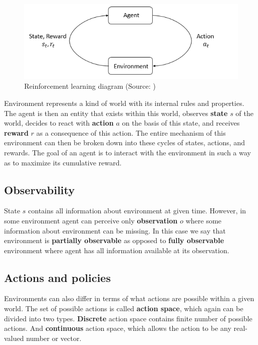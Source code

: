 \begin{figure}[!ht]
    \centering
    \includegraphics*[width=12cm]{rl_diagram_transparent_bg.png}

    \caption{Reinforcement learning diagram (Source: \cite{SpinningUpIntro})}

\end{figure}\label{RLDiagram}

Environment represents a kind of world with its internal rules and properties. 
The agent is then an entity that exists within this world, observes \textbf{state} $s$ of the world, decides to react with \textbf{action} $a$ on the basis of this state, and receives \textbf{reward} $r$ as a consequence of this action.
The entire mechanism of this environment can then be broken down into these cycles of states, actions, and rewards.
The goal of an agent is to interact with the environment in such a way as to maximize its cumulative reward.



\subsection*{Observability}
State $s$ contains all information about environment at given time. 
However, in some environment agent can perceive only \textbf{observation} $o$ where some information about environment can be missing.
In this case we say that environment is \textbf{partially observable} as opposed to \textbf{fully observable} environment where agent has all information available at its observation.

\subsection*{Actions and policies}
Environments can also differ in terms of what actions are possible within a given world.
The set of possible actions is called \textbf{action space}, which again can be divided into two types. 
\textbf{Discrete} action space contains finite number of possible actions. 
And \textbf{continuous} action space, which allows the action to be any real-valued number or vector.

